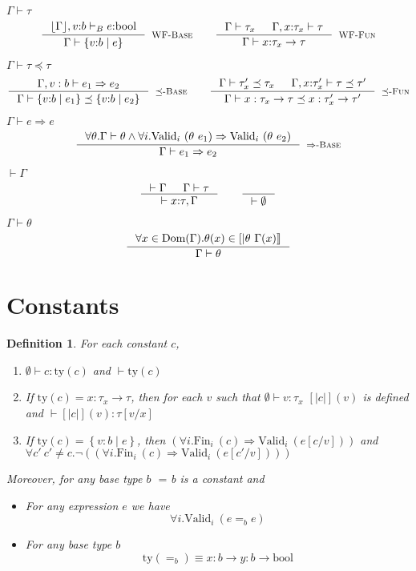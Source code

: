 \documentclass[10pt,a4paper]{article}
\newtheorem{definition}{Definition}
\newcommand\rulename[1]{\textsc{#1}\xspace}
\newcommand\rwbase{\rulename{WF-Base}}
\newcommand\rwfun{\rulename{WF-Fun}}
\newcommand\rwcon{\rulename{WF-Con}}
\newcommand\rsubbase{\ensuremath{\preceq}\rulename{-Base}}
\newcommand\rsubfun{\ensuremath{\preceq}\rulename{-Fun}}
\newcommand\rsubcon{\ensuremath{\preceq}\rulename{-Con}}
\newcommand\rimpl{\ensuremath{\Rightarrow}\rulename{-Base}}
\newcommand\tbool{\ensuremath{\text{bool}}}
\newcommand\tref[3]{\ensuremath{\left\lbrace {#1} \colon {#2} \mid {#3} \right\rbrace}}
\newcommand\tconref[4]{\tref{#3}{\tcon{#1}{#2}}{#4}}
\newcommand\tcon[2]{\ensuremath{#1\ #2}}
\newcommand\tfun[3]{\ensuremath{#1\colon #2 \rightarrow #3}}
\newcommand\eqb[1]{\ensuremath{=_{#1}}}
\newcommand\eq{\eqb{}}
\newcommand\validi[1]{\ensuremath{\text{Valid}_{i}\ (#1)}}
\newcommand\fini[1]{\ensuremath{\text{Fin}_{i}\ (#1)}}
\newcommand\generalconditionInterp[2]
	{\ensuremath{(\forall i. \fini{#1} \Rightarrow \validi{#2})}}
\newcommand\generalconditionImpl[2]
	{\ensuremath{\forall i . \validi{#1} \Rightarrow \validi{#2}}}
\newcommand\generalconditionImplOne[1]
	{\ensuremath{\forall i . \validi{#1}}}
\newcommand\ty[1]{\ensuremath{\text{ty}({#1})}}
\newcommand\sub[2]{\ensuremath{\left[ #2 / #1 \right]}}
\newcommand\erase[1]{\ensuremath{\lfloor #1 \rfloor}}
\newcommand\interp[1]{\ensuremath{[|#1|]}}
\newcommand\hastype[3]{\ensuremath{#1 \vdash #2 \colon #3}}
\newcommand\hastypebase[3]{\ensuremath{#1 \vdash_B #2 \colon #3}}
\newcommand\iswellformed[2]{\ensuremath{#1 \vdash #2}}
\newcommand\issubtype[3]{\ensuremath{#1 \vdash #2 \preceq #3}}
\newcommand\issubref[3]{\ensuremath{#1 \vdash #2 \Rightarrow #3}}
\begin{document}
\hfill\mbox{\iswellformed{\Gamma}{\tau}}
$$
\inference{
	\hastypebase{\erase{\Gamma}, v\colon b}{e}{\tbool}
}{
	\iswellformed{\Gamma}{\tref{v}{b}{e}}
}[\rwbase]
\qquad
\inference{
	\iswellformed{\Gamma}{\tau_x} &&
	\iswellformed{\Gamma, x \colon \tau_x}{\tau}
}{
	\iswellformed{\Gamma}{\tfun{x}{\tau_x}{\tau}}
}[\rwfun]
$$

\hfill\mbox{\issubtype{\Gamma}{\tau}{\tau}}
$$
\inference{
	\issubref{\Gamma, v:b}{e_1}{e_2}
}{
	\issubtype{\Gamma}{\tref{v}{b}{e_1}}{\tref{v}{b}{e_2}}
}[\rsubbase]
\qquad
\inference{
	\issubtype{\Gamma}{\tau'_x}{\tau_x} &&
	\issubtype{\Gamma, x \colon \tau'_x}{\tau}{\tau'}
}{
	\issubtype{\Gamma}{x:\tau_x \rightarrow \tau}{x:\tau'_x \rightarrow \tau'}
}[\rsubfun]
$$

\hfill\mbox{\issubref{\Gamma}{e}{e}}
$$
\inference{
	\forall \theta. \iswellformed{\Gamma}{\theta} \land
	\generalconditionImpl{\theta\ e_1}{\theta\ e_2}
}{
	\issubref{\Gamma}{e_1}{e_2}
}[\rimpl]
$$

\hfill\mbox{\iswellformed{}{\Gamma}}
$$
\inference{
	\iswellformed{}{\Gamma} &&
	\iswellformed{\Gamma}{\tau}
}{
	\iswellformed{}{x\colon\tau,\Gamma}
}
\qquad
\inference{}{\iswellformed{}{\emptyset}}
$$


\hfill\mbox{\iswellformed{\Gamma}{\theta}}
$$
\inference{
	\forall x \in \text{Dom}(\Gamma). 
	\theta(x) \in \interp{\theta \ \Gamma(x)}
}{
	\iswellformed{\Gamma}{\theta}
}
$$


\section*{Constants}
\begin{definition}\label{def:constants}
For each constant $c$, 
\begin{enumerate}
\item \hastype{\emptyset}{c}{\ty{c}} and \iswellformed{}{\ty{c}}
\item If $\ty{c} = \tfun{x}{\tau_x}{\tau}$, then for each $v$ such that
\hastype{\emptyset}{v}{\tau_x} $\interp{c}(v)$ is defined and
\hastype{}{\interp{c}(v)}{\tau\sub{x}{v}}
\item If $\ty{c} = \tref{v}{b}{e}$, 
then \generalconditionInterp{c}{e\sub{v}{c}} and 
$\forall c'\ c' \neq c. \lnot (\generalconditionInterp{c}{e\sub{v}{c'}})$ 
\end{enumerate}
Moreover, for any base type $b$ \eq{b} is a constant and 
\begin{itemize}
\item For any expression $e$ we have 
$$\generalconditionImplOne{e \eqb{b} e}$$
\item For any base type $b$ 
$$\ty{=_b} \equiv \tfun{x}{b}{\tfun{y}{b}{\tbool}}$$
\end{itemize}
\end{definition}
\end{document}
